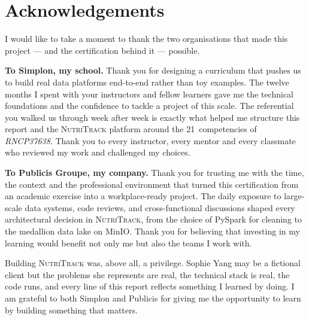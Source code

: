 \documentclass[a4paper,11pt,oneside,openany]{report}
\newcommand{\nutritrack}{\textsc{NutriTrack}}
\begin{document}
\chapter*{Acknowledgements}

I would like to take a moment to thank the two organisations that
made this project --- and the certification behind it --- possible.

\vspace{0.6cm}

\noindent\textbf{To Simplon, my school.} Thank you for designing a
curriculum that pushes us to build real data platforms end-to-end
rather than toy examples. The twelve months I spent with your
instructors and fellow learners gave me the technical foundations
and the confidence to tackle a project of this scale. The
referential you walked us through week after week is exactly what
helped me structure this report and the \nutritrack{} platform
around the 21~competencies of \textit{RNCP37638}. Thank you to
every instructor, every mentor and every classmate who reviewed my
work and challenged my choices.

\vspace{0.4cm}

\noindent\textbf{To Publicis Groupe, my company.} Thank you for
trusting me with the time, the context and the professional
environment that turned this certification from an academic
exercise into a workplace-ready project. The daily exposure to
large-scale data systems, code reviews, and cross-functional
discussions shaped every architectural decision in \nutritrack{},
from the choice of PySpark for cleaning to the medallion data lake
on MinIO. Thank you for believing that investing in my learning
would benefit not only me but also the teams I work with.

\vspace{0.6cm}

\noindent Building \nutritrack{} was, above all, a privilege.
Sophie Yang may be a fictional client but the problems she
represents are real, the technical stack is real, the code runs,
and every line of this report reflects something I learned by
doing. I am grateful to both Simplon and Publicis for giving me
the opportunity to learn by building something that matters.

\vspace{1cm}
\end{document}
